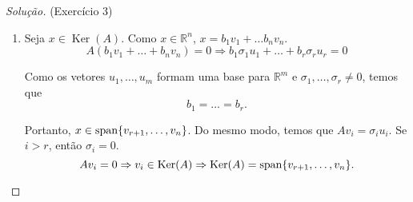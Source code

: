 \documentclass[a4paper,10pt]{article}
\newenvironment{solution}
  {\begin{proof}[Solução]}
  {\end{proof}}
\DeclareMathOperator{\Ker}{Ker}
\newcommand{\spann}[1]{\textnormal{span}\{#1\}}
\begin{document}
\begin{solution}{(Exercício 3)}
\begin{enumerate}
      \item Seja $x \in \Ker(A)$. Como $x\in \mathbb{R}^n$, $x = b_1v_1 + \dots b_nv_n$.
        \begin{equation*}
            A(b_1v_1 + \dots + b_nv_n) = 0 \Rightarrow b_1\sigma_1 u_1 + \dots + b_r\sigma_r u_r = 0
        \end{equation*}

        Como os vetores $u_1, \dots, u_m$ formam uma base para $\mathbb{R}^m$ e $\sigma_1,\dots,\sigma_r
        \neq 0$, temos que
        \begin{equation*}
          b_1 = \dots = b_r.
        \end{equation*}

        Portanto, $x \in \spann{v_{r+1}, \dots, v_n}$. Do mesmo modo, temos que
        $Av_i = \sigma_i u_i$. Se $i>r$, então $\sigma_i = 0$.
        \begin{equation*}
          Av_i = 0 \Rightarrow v_i \in \Ker(A) \Rightarrow \Ker(A) = \spann{v_{r+1}, \dots, v_n}.
        \end{equation*}


\end{enumerate}
\end{solution}
\end{document}
